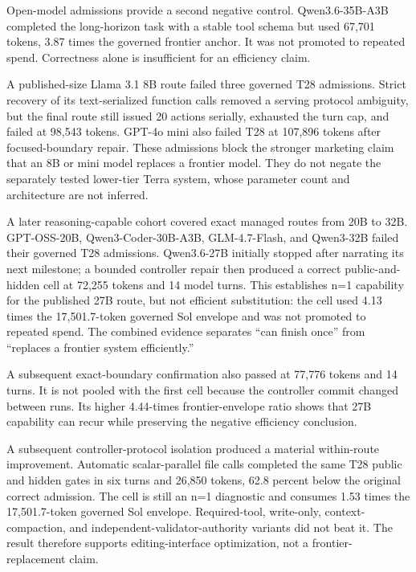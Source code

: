 \documentclass[10pt,twocolumn]{article}
\begin{document}
Open-model admissions provide a second negative control. Qwen3.6-35B-A3B
completed the long-horizon task with a stable tool schema but used 67,701
tokens, 3.87 times the governed frontier anchor. It was not promoted to repeated
spend. Correctness alone is insufficient for an efficiency claim.

A published-size Llama 3.1 8B route failed three governed T28 admissions.
Strict recovery of its text-serialized function calls removed a serving
protocol ambiguity, but the final route still issued 20 actions serially,
exhausted the turn cap, and failed at 98,543 tokens. GPT-4o mini also failed
T28 at 107,896 tokens after focused-boundary repair. These admissions block
the stronger marketing claim that an 8B or mini model replaces a frontier
model. They do not negate the separately tested lower-tier Terra system, whose
parameter count and architecture are not inferred.

A later reasoning-capable cohort covered exact managed routes from 20B to 32B.
GPT-OSS-20B, Qwen3-Coder-30B-A3B, GLM-4.7-Flash, and Qwen3-32B failed their
governed T28 admissions. Qwen3.6-27B initially stopped after narrating its next
milestone; a bounded controller repair then produced a correct public-and-hidden
cell at 72,255 tokens and 14 model turns. This establishes n=1 capability for
the published 27B route, but not efficient substitution: the cell used 4.13
times the 17,501.7-token governed Sol envelope and was not promoted to repeated
spend. The combined evidence separates ``can finish once'' from ``replaces a
frontier system efficiently.''

A subsequent exact-boundary confirmation also passed at 77,776 tokens and 14
turns. It is not pooled with the first cell because the controller commit
changed between runs. Its higher 4.44-times frontier-envelope ratio shows that
27B capability can recur while preserving the negative efficiency conclusion.

A subsequent controller-protocol isolation produced a material within-route
improvement. Automatic scalar-parallel file calls completed the same T28 public
and hidden gates in six turns and 26,850 tokens, 62.8 percent below the original
correct admission. The cell is still an n=1 diagnostic and consumes 1.53 times
the 17,501.7-token governed Sol envelope. Required-tool, write-only,
context-compaction, and independent-validator-authority variants did not beat
it. The result therefore supports editing-interface optimization, not a
frontier-replacement claim.
\end{document}
